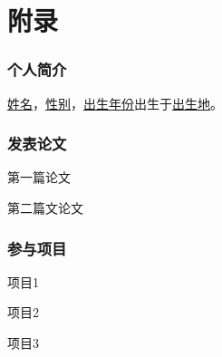\chapter{附录}
\subsection*{个人简介}
\underline{姓名}，\underline{性别}，\underline{出生年份}出生于\underline{出生地}。
\subsection*{发表论文}
{
\setlength\parindent{0em}
\everypar{\hangafter=1\hangindent=2em\relax}

第一篇论文

第二篇文论文

\subsection*{参与项目}

项目1

项目2

项目3
}
